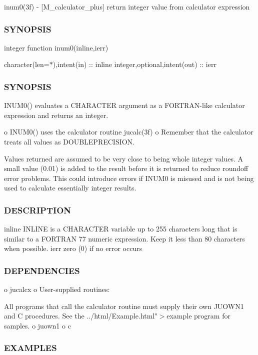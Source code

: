 inum0(3f) -\/ \mbox{[}M\+\_\+calculator\+\_\+plus\mbox{]} return integer value from calculator expression \subsubsection*{S\+Y\+N\+O\+P\+S\+IS}

integer function inum0(inline,ierr)

character(len=$\ast$),intent(in) \+:\+: inline integer,optional,intent(out) \+:\+: ierr

\subsubsection*{S\+Y\+N\+O\+P\+S\+IS}

\begin{DoxyVerb}INUM0() evaluates a CHARACTER argument as a FORTRAN-like
calculator expression and returns an integer.

 o INUM0() uses the calculator routine jucalc(3f)
 o Remember that the calculator treats all values as DOUBLEPRECISION.

Values returned are assumed to be very close to being whole integer
values.  A small value (0.01) is added to the result before it is
returned to reduce roundoff error problems. This could introduce
errors if INUM0 is misused and is not being used to calculate
essentially integer results.
\end{DoxyVerb}
 \subsubsection*{D\+E\+S\+C\+R\+I\+P\+T\+I\+ON}

\begin{DoxyVerb}inline  INLINE is a CHARACTER variable up to 255 characters long that is
        similar to a FORTRAN 77 numeric expression. Keep it less than 80
        characters when possible.
ierr    zero (0) if no error occurs
\end{DoxyVerb}


\subsubsection*{D\+E\+P\+E\+N\+D\+E\+N\+C\+I\+ES}

o jucalcx o User-\/supplied routines\+:

All programs that call the calculator routine must supply their own J\+U\+O\+W\+N1 and C procedures. See the ../html/\+Example.html"$>$example program for samples. o juown1 o c \subsubsection*{E\+X\+A\+M\+P\+L\+ES}

